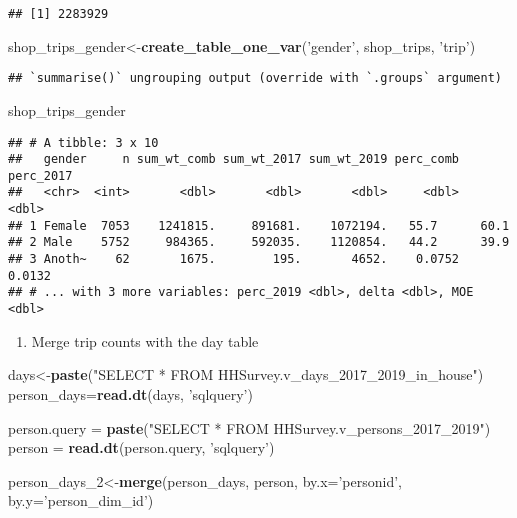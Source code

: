 \documentclass[
]{article}
\newenvironment{Shaded}{\begin{snugshade}}{\end{snugshade}}
\newcommand{\DataTypeTok}[1]{\textcolor[rgb]{0.13,0.29,0.53}{#1}}
\newcommand{\DecValTok}[1]{\textcolor[rgb]{0.00,0.00,0.81}{#1}}
\newcommand{\KeywordTok}[1]{\textcolor[rgb]{0.13,0.29,0.53}{\textbf{#1}}}
\newcommand{\NormalTok}[1]{#1}
\newcommand{\StringTok}[1]{\textcolor[rgb]{0.31,0.60,0.02}{#1}}
\providecommand{\tightlist}{%
  \setlength{\itemsep}{0pt}\setlength{\parskip}{0pt}}
\begin{document}
\begin{verbatim}
## [1] 2283929
\end{verbatim}

\begin{Shaded}
\begin{Highlighting}[]
\NormalTok{shop_trips_gender<-}\KeywordTok{create_table_one_var}\NormalTok{(}\StringTok{'gender'}\NormalTok{, shop_trips, }\StringTok{'trip'}\NormalTok{)}
\end{Highlighting}
\end{Shaded}

\begin{verbatim}
## `summarise()` ungrouping output (override with `.groups` argument)
\end{verbatim}

\begin{Shaded}
\begin{Highlighting}[]
\NormalTok{shop_trips_gender}
\end{Highlighting}
\end{Shaded}

\begin{verbatim}
## # A tibble: 3 x 10
##   gender     n sum_wt_comb sum_wt_2017 sum_wt_2019 perc_comb perc_2017
##   <chr>  <int>       <dbl>       <dbl>       <dbl>     <dbl>     <dbl>
## 1 Female  7053    1241815.     891681.    1072194.   55.7      60.1   
## 2 Male    5752     984365.     592035.    1120854.   44.2      39.9   
## 3 Anoth~    62       1675.        195.       4652.    0.0752    0.0132
## # ... with 3 more variables: perc_2019 <dbl>, delta <dbl>, MOE <dbl>
\end{verbatim}

\begin{enumerate}
\def\labelenumi{\arabic{enumi}.}
\setcounter{enumi}{2}
\tightlist
\item
  Merge trip counts with the day table
\end{enumerate}

\begin{Shaded}
\begin{Highlighting}[]
\NormalTok{days<-}\KeywordTok{paste}\NormalTok{(}\StringTok{"SELECT * FROM HHSurvey.v_days_2017_2019_in_house"}\NormalTok{)}
\NormalTok{person_days=}\KeywordTok{read.dt}\NormalTok{(days, }\StringTok{'sqlquery'}\NormalTok{)}

\NormalTok{person.query =}\StringTok{ }\KeywordTok{paste}\NormalTok{(}\StringTok{"SELECT * FROM HHSurvey.v_persons_2017_2019"}\NormalTok{)}
\NormalTok{person =}\StringTok{ }\KeywordTok{read.dt}\NormalTok{(person.query, }\StringTok{'sqlquery'}\NormalTok{)}

\NormalTok{person_days_}\DecValTok{2}\NormalTok{<-}\KeywordTok{merge}\NormalTok{(person_days, person, }\DataTypeTok{by.x=}\StringTok{'personid'}\NormalTok{, }\DataTypeTok{by.y=}\StringTok{'person_dim_id'}\NormalTok{)}
\end{Highlighting}
\end{Shaded}
\end{document}
